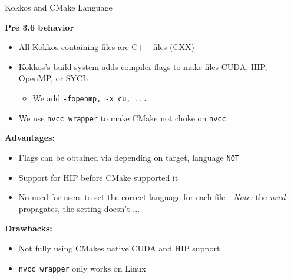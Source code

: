 \begin{frame}[fragile]{Kokkos and CMake Language}

  \textbf{Pre 3.6 behavior}

  \begin{itemize}
    \item {All Kokkos containing files are C++ files (CXX)}
    \item {Kokkos's build system adds compiler flags to make files CUDA, HIP, OpenMP, or SYCL}
    \begin{itemize}
      \item {We add \texttt{-fopenmp, -x cu, ...}}
    \end{itemize}
    \item {We use \texttt{nvcc\_wrapper} to make CMake not choke on \texttt{nvcc}}
  \end{itemize}

  \textbf{Advantages:}
  \begin{itemize}
    \item {Flags can be obtained via depending on target, language \texttt{NOT}}
    \item {Support for HIP before CMake supported it}
    \item {No need for users to set the correct language for each file - \textit{Note:} the \textit{need} propagates, the setting doesn't ...}
  \end{itemize}

  \textbf{Drawbacks:}
  \begin{itemize}
    \item {Not fully using CMakes native CUDA and HIP support}
    \item {\texttt{nvcc\_wrapper} only works on Linux}
  \end{itemize}

	
\end{frame}


